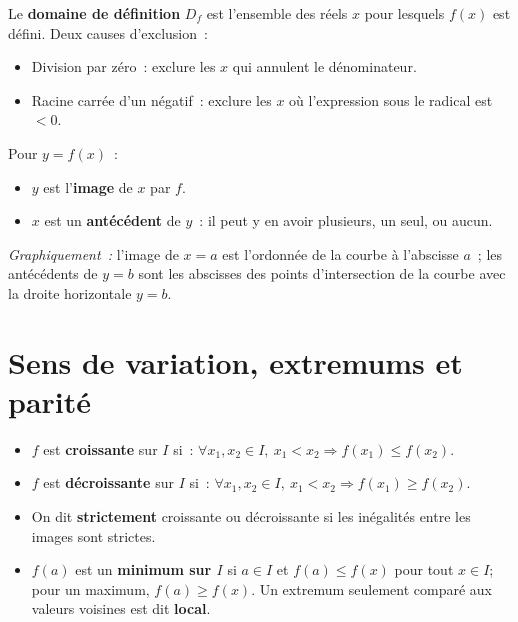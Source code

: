\begin{defn}
Le \textbf{domaine de d\'efinition} $D_f$ est l'ensemble des r\'eels $x$
pour lesquels $f(x)$ est d\'efini. Deux causes d'exclusion~:
\begin{itemize}
  \item Division par z\'ero~: exclure les $x$ qui annulent le d\'enominateur.
  \item Racine carr\'ee d'un n\'egatif~: exclure les $x$ o\`u l'expression
        sous le radical est $<0$.
\end{itemize}
\end{defn}

\begin{defn}
Pour $y = f(x)$~:
\begin{itemize}
  \item $y$ est l'\textbf{image} de $x$ par $f$.
  \item $x$ est un \textbf{ant\'ec\'edent} de $y$~: il peut y en avoir
        plusieurs, un seul, ou aucun.
\end{itemize}
\emph{Graphiquement~:} l'image de $x=a$ est l'ordonn\'ee de la courbe
\`a l'abscisse $a$~; les ant\'ec\'edents de $y=b$ sont les abscisses
des points d'intersection de la courbe avec la droite horizontale $y=b$.
\end{defn}

\section{Sens de variation, extremums et parit\'e}

\begin{defn}
\begin{itemize}
  \item $f$ est \textbf{croissante} sur $I$ si~:
        $\forall x_1,x_2\in I,\ x_1<x_2\Rightarrow f(x_1)\leq f(x_2)$.
  \item $f$ est \textbf{d\'ecroissante} sur $I$ si~:
        $\forall x_1,x_2\in I,\ x_1<x_2\Rightarrow f(x_1)\geq f(x_2)$.
  \item On dit \textbf{strictement} croissante ou d\'ecroissante si les
        in\'egalit\'es entre les images sont strictes.
  \item $f(a)$ est un \textbf{minimum sur $I$} si $a\in I$ et
        $f(a)\leq f(x)$ pour tout $x\in I$; pour un maximum, $f(a)\geq f(x)$.
        Un extremum seulement compar\'e aux valeurs voisines est dit \textbf{local}.
\end{itemize}
\end{defn}

